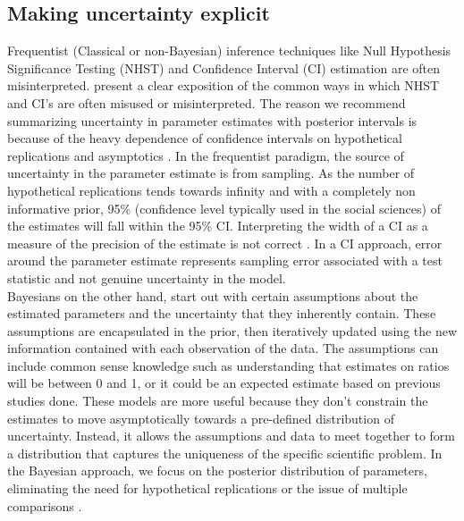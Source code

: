\documentclass{article}
\begin{document}
\subsection{Making uncertainty explicit}
Frequentist (Classical or non-Bayesian) inference techniques like Null Hypothesis Significance Testing (NHST) and Confidence Interval (CI) estimation are often misinterpreted.  present a clear exposition of the common ways in which NHST and CI's are often misused or misinterpreted. The reason we recommend summarizing uncertainty in parameter estimates with posterior intervals is because of the heavy dependence of confidence intervals on hypothetical replications and asymptotics \cite{gelman2013commentary}. In the frequentist paradigm, the source of uncertainty in the parameter estimate is from sampling. As the number of hypothetical replications tends towards infinity and with a completely non informative prior, 95\% (confidence level typically used in the social sciences) of the estimates will fall within the 95\% CI. Interpreting the width of a CI as a measure of the precision of the estimate is  not correct \cite{morey2016fallacy}. In a CI approach, error around the parameter estimate represents sampling error associated with a test statistic and not genuine uncertainty in the model.\\
Bayesians on the other hand, start out with certain assumptions about the estimated parameters and the uncertainty that they inherently contain. These assumptions are encapsulated in the prior, then iteratively updated using the new information contained with each observation of the data. The assumptions can include common sense knowledge such as understanding that estimates on ratios will be between 0 and 1, or it could be an expected estimate based on previous studies done. These models are more useful because they don't constrain the estimates to move asymptotically towards a pre-defined distribution of uncertainty. Instead, it allows the assumptions and data to meet together to form a distribution that captures the uniqueness of the specific scientific problem. In the Bayesian approach, we focus on the posterior distribution of parameters, eliminating the need for hypothetical replications or the issue of multiple comparisons \cite{gelman2014bayesian}.\\
\end{document}
